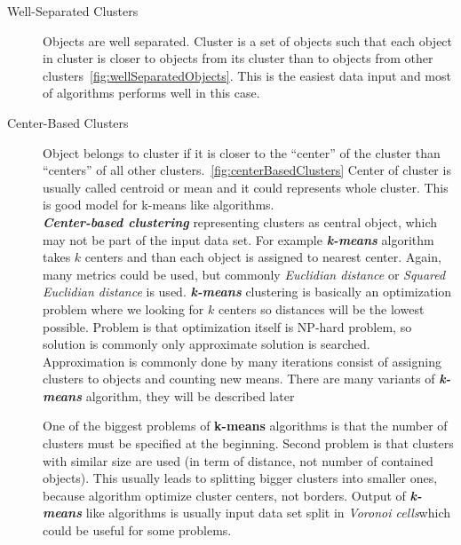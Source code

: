 \begin{description}
\item[Well-Separated Clusters] Objects are well separated. Cluster is a set of objects such that each object in cluster is closer to objects from its cluster than to objects from other clusters~\autoref{fig:wellSeparatedObjects}. This is the easiest data input and most of algorithms performs well in this case.

\item[Center-Based Clusters] Object belongs to cluster if it is closer to the ``center'' of the cluster than ``centers'' of all other clusters.~\autoref{fig:centerBasedClusters} Center of cluster is usually called centroid or mean and it could represents whole cluster. This is good model for k-means like algorithms. \\
\textit{\textbf{Center-based clustering}} representing clusters as central object, which may not be part of the input data set.  For example \textit{\textbf{k-means}} algorithm takes $k$ centers and than each object is assigned to nearest center. Again, many metrics could be used, but commonly \textit{Euclidian distance} or \textit{Squared Euclidian distance} is used. \textit{\textbf{k-means}} clustering is basically an optimization problem where we looking for $k$ centers so distances will be the lowest possible. Problem is that optimization itself is NP-hard problem, so solution is commonly only approximate solution is searched. Approximation is commonly done by many iterations consist of assigning clusters to objects and  counting new means.
There are many variants of \textit{\textbf{k-means}} algorithm, they will be described later %

One of the biggest problems of \textbf{k-means} algorithms is that the number of clusters must be specified at the beginning. Second problem is that clusters with similar size are used (in term of distance, not number of contained objects). This usually leads to splitting bigger clusters into smaller ones, because algorithm optimize cluster centers, not borders.
Output of \textit{\textbf{k-means}} like algorithms is usually input data set split in \textit{Voronoi cells}which could be useful for some problems.


\end{description}
